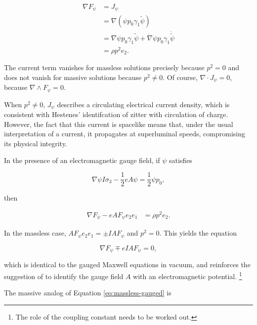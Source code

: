 \documentclass[twocolumn]{article}
\begin{document}
    \begin{align}
      \nabla F_\psi &= J_\psi\\
      &= \nabla (\psi p_0 \gamma_1 \widetilde \psi)\\
      &= \nabla \psi p_0 \gamma_1 \widetilde \psi + \dot \nabla \psi p_0 \gamma_1 \dot{\widetilde \psi} \\
      &= \rho p^2 e_2.
    \end{align}

    The current term vanishes for massless solutions precisely because $p^2 = 0$ and does not vanish for massive solutions because $p^2 \not= 0$. Of course, $\nabla \cdot J_\psi = 0$, because $\nabla \wedge F_\psi = 0$.

    When $p^2 \not= 0$, $J_\psi$ describes a circulating electrical current density, which is consistent with Hestenes' identifcation of zitter with circulation of charge. However, the fact that this current is spacelike means that, under the usual interpretation of a current, it propagates at superluminal speeds, compromising its physical integrity.

    In the presence of an electromagnetic gauge field, if $\psi$ satisfies

    \begin{equation}
      \nabla \psi I \sigma_3 - \frac{1}{2} e A \psi = \frac{1}{2} \psi p_0,
    \end{equation}

    then

    \begin{align}
      \nabla F_\psi - e A F_\psi e_2 e_1
      &= \rho p^2 e_2.\label{eq:gaugedem}
    \end{align}

    In the massless case, $A F_\psi e_2 e_1 = \pm I A F_\psi$ and $p^2 = 0$. This yields the equation 

    \begin{equation}
      \nabla F_\psi \mp e I A F_\psi = 0,\label{eq:massless-gauged}
    \end{equation}

    which is identical to the gauged Maxwell equations in vacuum,\cite{duality}\cite{malik}\cite{tiwari} and reinforces the suggestion of \cite{duality} to identify the gauge field $A$ with an electromagnetic potential. \footnote{The role of the coupling constant needs to be worked out.}

    The massive analog of Equation \ref{eq:massless-gauged} is \cite{duality} \cite{tiwari}
\end{document}
